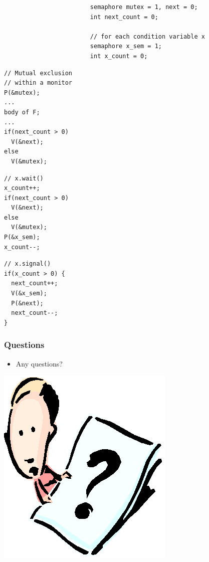 \documentclass[CJKutf8,xcolor=pdftex,dvipsnames,table]{beamer}
\begin{document}
\begin{CJK*}{UTF8}{song}
\begin{frame}[fragile]
\begin{lstlisting}
                        semaphore mutex = 1, next = 0;
                        int next_count = 0;

                        // for each condition variable x
                        semaphore x_sem = 1;
                        int x_count = 0;
\end{lstlisting} \pause

  \begin{minipage}[c]{0.4\textwidth}

\begin{lstlisting}
// Mutual exclusion
// within a monitor
P(&mutex);
...
body of F;
...
if(next_count > 0)
  V(&next);
else
  V(&mutex);
\end{lstlisting}
    \pause

  \end{minipage}%
  \begin{minipage}[c]{0.3\textwidth}

\begin{lstlisting}
// x.wait()
x_count++;
if(next_count > 0)
  V(&next);
else
  V(&mutex);
P(&x_sem);
x_count--;
\end{lstlisting}

    \pause

  \end{minipage}%
  \begin{minipage}[c]{0.3\textwidth}
\begin{lstlisting}
// x.signal()
if(x_count > 0) {
  next_count++;
  V(&x_sem);
  P(&next);
  next_count--;
}
\end{lstlisting}

  \end{minipage}
\end{frame}

  \begin{frame}
  \frametitle{Questions}
  \begin{itemize}
  \item{Any questions?}
  \end{itemize}
  \begin{center}
    \includegraphics[scale=.5]{question}
  \end{center}
  \end{frame}


\end{CJK*}
\end{document}
